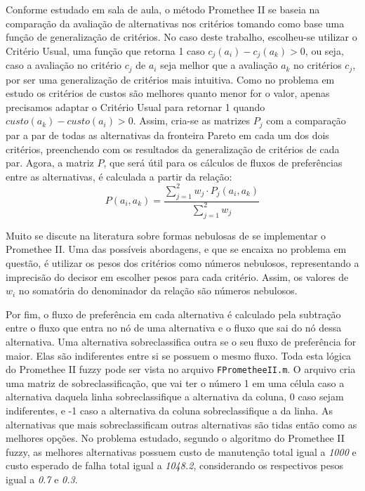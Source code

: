 Conforme estudado em sala de aula, o método Promethee II se baseia na comparação da avaliação de alternativas nos critérios tomando como base uma função de generalização de critérios. No caso deste trabalho, escolheu-se utilizar o Critério Usual, uma função que retorna 1 caso $c_j(a_i) - c_j(a_k) > 0$, ou seja, caso a avaliação no critério $c_j$ de $a_i$ seja melhor que a avaliação $a_k$ no critérios $c_j$, por ser uma generalização de critérios mais intuitiva. Como no problema em estudo os critérios de custos são melhores quanto menor for o valor, apenas precisamos adaptar o Critério Usual para retornar 1 quando $custo(a_k) - custo(a_i) > 0$. Assim, cria-se as matrizes $P_j$ com a comparação par a par de todas as alternativas da fronteira Pareto em cada um dos dois critérios, preenchendo com os resultados da generalização de critérios de cada par. Agora, a matriz $P$, que será útil para os cálculos de fluxos de preferências entre as alternativas, é calculada a partir da relação:
\begin{equation}
P(a_i, a_k) = \frac{\sum_{j=1}^{2} w_j \cdot P_j(a_i, a_k)}{\sum_{j=1}^{2} w_j}
\end{equation}

Muito se discute na literatura sobre formas nebulosas de se implementar o Promethee II. Uma das possíveis abordagens, e que se encaixa no problema em questão, é utilizar os pesos dos critérios como números nebulosos, representando a imprecisão do decisor em escolher pesos para cada critério. Assim, os valores de $w_i$ no somatória do denominador da relação são números nebulosos. 

Por fim, o fluxo de preferência em cada alternativa é calculado pela subtração entre o fluxo que entra no nó de uma alternativa e o fluxo que sai do nó dessa alternativa. Uma alternativa sobreclassifica outra se o seu fluxo de preferência for maior. Elas são indiferentes entre si se possuem o mesmo fluxo. Toda esta lógica do Promethee II fuzzy pode ser vista no arquivo \texttt{FPrometheeII.m}. O arquivo cria uma matriz de sobreclassificação, que vai ter o número 1 em uma célula caso a alternativa daquela linha sobreclassifique a alternativa da coluna, 0 caso sejam indiferentes, e -1 caso a alternativa da coluna sobreclassifique a da linha. As alternativas que mais sobreclassificam outras alternativas são tidas então como as melhores opções. No problema estudado, segundo o algoritmo do Promethee II fuzzy, as melhores alternativas possuem custo de manutenção total igual a \textit{1000} e custo esperado de falha total igual a \textit{1048.2}, considerando os respectivos pesos igual a \textit{0.7} e \textit{0.3}.